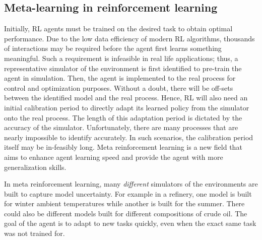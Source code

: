 \subsection{Meta-learning in reinforcement learning}
Initially, RL agents must be trained on the desired task to obtain optimal performance.  Due to the low data efficiency of modern RL algorithms, thousands of interactions may be required before the agent first learns something meaningful.  Such a requirement is infeasible in real life applications; thus, a representative simulator of the environment is first identified to pre-train the agent in simulation.  Then, the agent is implemented to the real process for control and optimization purposes.  Without a doubt, there will be off-sets between the identified model and the real process. Hence, RL will also need an initial calibration period to directly adapt its learned policy from the simulator onto the real process.  The length of this adaptation period is dictated by the accuracy of the simulator.  Unfortunately, there are many processes that are nearly impossible to identify accurately.  In such scenarios, the calibration period itself may be in-feasibly long. Meta reinforcement learning is a new field that aims to enhance agent learning speed and provide the agent with more generalization skills.

In meta reinforcement learning, many \textit{different} simulators of the environments are built to capture model uncertainty.  For example in a refinery, one model is built for winter ambient temperatures while another is built for the summer.  There could also be different models built for different compositions of crude oil.  The goal of the agent is to adapt to new tasks quickly, even when the exact same task was not trained for.